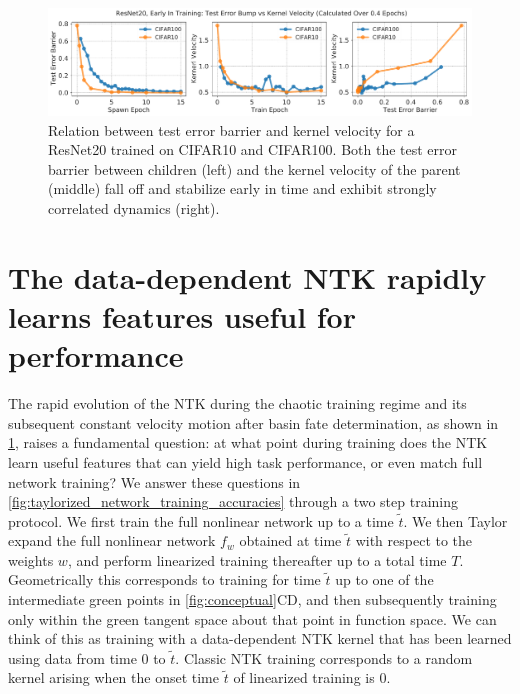 \documentclass{article}
\begin{document}
\begin{figure}[h]
\centering
\includegraphics[width=0.8\linewidth]{figures/kernel_velocity.pdf}
\caption{Relation between test error barrier and kernel velocity for a ResNet20 trained on CIFAR10 and CIFAR100. Both the test error barrier between children (left) and the kernel velocity of the parent (middle) fall off and stabilize early in time and exhibit strongly correlated dynamics (right).\vspace*{-1em}}
\label{fig:kernel_distance_error_bump}
\end{figure}
%

\section{The data-dependent NTK rapidly learns features useful for performance}
\label{sec:dataNTK}

The rapid evolution of the NTK during the chaotic training regime and its subsequent constant velocity motion after basin fate determination, as shown in \cref{fig:kernel_distance_error_bump}, raises a fundamental question: at what point during training does the NTK learn useful features that can yield high task performance, or even match full network training?  We answer these questions in \cref{fig:taylorized_network_training_accuracies} through a two step training protocol. We first train the full nonlinear network up to a time $\tilde t$. We then Taylor expand the full nonlinear network $f_w$ obtained at time $\tilde t$ with respect to the weights $w$, and perform linearized training thereafter up to a total time $T$. Geometrically this corresponds to training for time $\tilde t$ up to one of the intermediate green points in \cref{fig:conceptual}CD, and then subsequently training only within the green tangent space about that point in function space.  We can think of this as training with a data-dependent NTK kernel that has been learned using data from time $0$ to $\tilde t$.  Classic NTK training corresponds to a random kernel arising when the onset time $\tilde t$ of linearized training is $0$.
\end{document}
